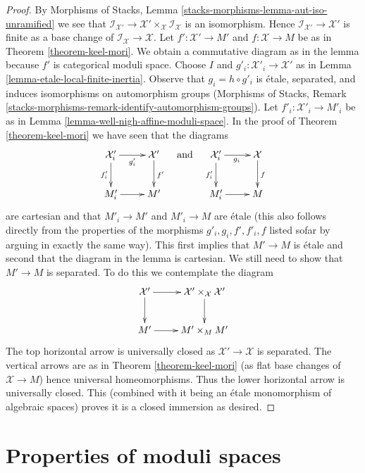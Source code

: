 \documentclass{stacks-project}
\theoremstyle{plain}
\theoremstyle{definition}
\theoremstyle{remark}
\numberwithin{equation}{subsection}
\begin{document}
\begin{proof}
By Morphisms of Stacks, Lemma \ref{stacks-morphisms-lemma-aut-iso-unramified}
we see that
$\mathcal{I}_{\mathcal{X}'} \to
\mathcal{X}' \times_\mathcal{X} \mathcal{I}_\mathcal{X}$
is an isomorphism. Hence $\mathcal{I}_{\mathcal{X}'} \to \mathcal{X}'$
is finite as a base change of $\mathcal{I}_\mathcal{X} \to \mathcal{X}$.
Let $f' : \mathcal{X}' \to M'$ and $f : \mathcal{X} \to M$ be as in
Theorem \ref{theorem-keel-mori}.
We obtain a commutative diagram as in the lemma because
$f'$ is categorical moduli space.
Choose $I$ and $g'_i : \mathcal{X}'_i \to \mathcal{X}'$ as in
Lemma \ref{lemma-etale-local-finite-inertia}.
Observe that $g_i = h \circ g'_i$
is \'etale, separated, and induces isomorphisms on
automorphism groups (Morphisms of Stacks, Remark
\ref{stacks-morphisms-remark-identify-automorphism-groups}).
Let $f'_i : \mathcal{X}'_i \to M'_i$ be as in
Lemma \ref{lemma-well-nigh-affine-moduli-space}.
In the proof of Theorem \ref{theorem-keel-mori}
we have seen that the diagrams
$$
\xymatrix{
\mathcal{X}'_i \ar[d]_{f'_i} \ar[r]_{g'_i} &
\mathcal{X}' \ar[d]^{f'} \\
M'_i \ar[r] &
M'
}
\quad\text{and}\quad
\xymatrix{
\mathcal{X}'_i \ar[d]_{f'_i} \ar[r]_{g_i} &
\mathcal{X} \ar[d]^f \\
M'_i \ar[r] &
M
}
$$
are cartesian and that $M'_i \to M'$ and $M'_i \to M$ are \'etale
(this also follows directly from the properties of the morphisms
$g'_i, g_i, f', f'_i, f$ listed sofar by arguing in exactly the same way).
This first implies that $M' \to M$ is \'etale and second that
the diagram in the lemma is cartesian. We still need to show
that $M' \to M$ is separated. To do this we contemplate the
diagram
$$
\xymatrix{
\mathcal{X}' \ar[r] \ar[d] &
\mathcal{X}' \times_\mathcal{X} \mathcal{X}' \ar[d] \\
M' \ar[r] &
M' \times_M M'
}
$$
The top horizontal arrow is universally closed as
$\mathcal{X}' \to \mathcal{X}$ is separated.
The vertical arrows are as in Theorem \ref{theorem-keel-mori}
(as flat base changes of $\mathcal{X} \to M$)
hence universal homeomorphisms. Thus the lower horizontal
arrow is universally closed. This (combined with it being an \'etale
monomorphism of algebraic spaces) proves it is a closed immersion as desired.
\end{proof}





\section{Properties of moduli spaces}
\label{section-properties-moduli-spaces}
\end{document}
